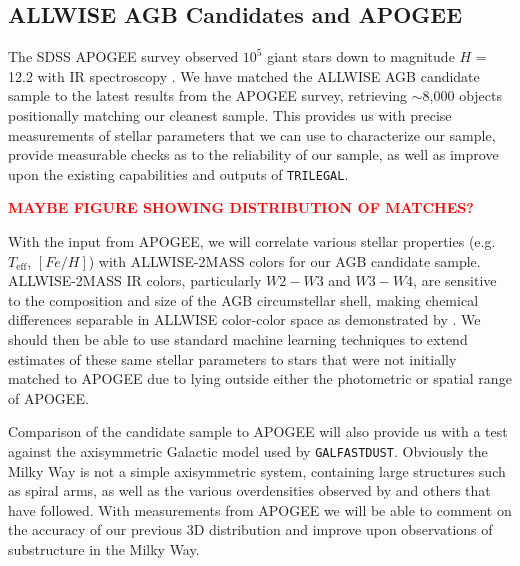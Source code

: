 \subsection{ALLWISE AGB Candidates and APOGEE}
\label{sec:apogee}
The SDSS APOGEE survey observed $10^5$ giant stars down to magnitude $H$ = 12.2 with IR spectroscopy \citep{2012ApJ...755L..25N}. We have matched the ALLWISE AGB candidate sample to the latest results from the APOGEE survey, retrieving $\sim$8,000 objects positionally matching our cleanest sample.  This provides us with precise measurements of stellar parameters that we can use to characterize our sample, provide measurable checks as to the reliability of our sample, as well as improve upon the existing capabilities and outputs of {\tt TRILEGAL}.

\begin{center}\textbf{\textcolor{red}{MAYBE FIGURE SHOWING DISTRIBUTION OF MATCHES?}}\end{center}

With the input from APOGEE, we will correlate various stellar properties (e.g. $T_\text{eff}$, $[Fe/H]$) with ALLWISE-2MASS colors for our AGB candidate sample. ALLWISE-2MASS IR colors, particularly $W2-W3$ and $W3-W4$, are sensitive to the composition and size of the AGB circumstellar shell, making chemical differences separable in ALLWISE color-color space as demonstrated by \cite{2014MNRAS.442.3361N}. We should then be able to use standard machine learning techniques \citep[e.g. those found in ][]{2013sdmm.book.....I} to extend estimates of these same stellar parameters to stars that were not initially matched to APOGEE due to lying outside either the photometric or spatial range of APOGEE.

Comparison of the candidate sample to APOGEE will also provide us with a test against the axisymmetric Galactic model used by {\tt GALFASTDUST}. Obviously the Milky Way is not a simple axisymmetric system, containing large structures such as spiral arms, as well as the various overdensities observed by \cite{2008ApJ...673..864J} and others that have followed.  With measurements from APOGEE we will be able to comment on the accuracy of our previous 3D distribution and improve upon observations of substructure in the Milky Way.

